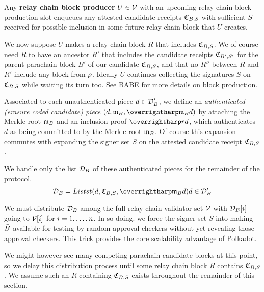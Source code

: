 
Any {\bf relay chain block producer} $U \in \mathcal{V}$ with an upcoming relay chain block production slot enqueues any attested candidate receipts $\mathfrak{C}_{B,S}$ with sufficient $S$ received for possible inclusion in some future relay chain block that $U$ creates.  

We now suppose $U$ makes a relay chain block $R$ that includes $\mathfrak{C}_{B,S}$.  We of course need $R$ to have an ancestor $R'$ that includes the candidate receipts $\mathfrak{C}_{B',S'}$ for the parent parachain block $B'$ of our candidate $\mathfrak{C}_{B,S}$, and that no $R''$ between $R$ and $R'$ include any block from $\rho$.  Ideally $U$ continues collecting the signatures $S$ on $\mathfrak{C}_{B,S}$ while waiting its turn too.  See \href{http://research.web3.foundation/en/latest/polkadot/BABE/Babe/}{BABE} for more details on block production.

Associated to each unauthenticated piece $d \in \mathcal{D}'_B$, we define an {\em authenticated (erasure coded candidate) piece} $(d,\merkleroot_B,\vect{\merkleroot_B d})$ by attaching the Merkle root $\mathfrak{m}_B$ and an inclusion proof $\vect{rd}$, which authenticates $d$ as being committed to by the Merkle root $\mathfrak{m}_B$.  Of course this expansion commutes with expanding the signer set $S$ on the attested candidate receipt $\mathfrak{C}_{B,S}$.

We handle only the list $\mathcal{D}_B$ of these authenticated pieces for the remainder of the protocol. 
$$ \pieces_B = Listst{ (d,\receipt_{B,S},\vect{\merkleroot_B d}) }{ d \in \prepieces_B } $$

We must distribute $\mathcal{D}_B$ among the full relay chain validator set $\mathcal{V}$ with $\mathcal{D}_B[i]$ going to $\mathcal{V}[i]$ for $i = 1,\ldots,n$.  In so doing. we force the signer set $S$ into making $\bar{B}$ available for testing by random approval checkers without yet revealing those approval checkers.  This trick provides the core scalability advantage of Polkadot.

We might however see many competing parachain candidate blocks at this point, so we delay this distribution process until some relay chain block $R$ contains $\mathfrak{C}_{B,S}$.  We assume such an $R$ containing $\mathfrak{C}_{B,S}$ exists throughout the remainder of this section.


